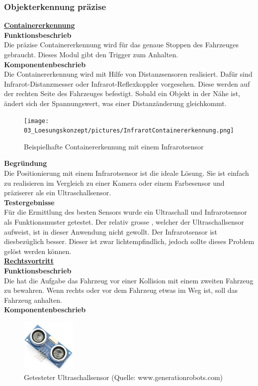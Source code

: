 \subsubsection{Objekterkennung präzise}
\underline{\textbf{Containererkennung}}\\[0.2cm]
\textbf{Funktionsbeschrieb}\\[0.2cm]
Die präzise Containererkennung wird für das genaue Stoppen des Fahrzeuges gebraucht. Dieses Modul gibt den Trigger zum Anhalten.\\[0.2cm]
\textbf{Komponentenbeschrieb}\\[0.2cm]
Die Containererkennung wird mit Hilfe von Distanzsensoren realisiert. Dafür sind Infrarot-Distanzmesser oder Infrarot-Reflexkoppler vorgesehen. Diese werden auf der rechten Seite des Fahrzeuges befestigt. Sobald ein Objekt in der Nähe ist, ändert sich der Spannungswert, was einer Distanzänderung gleichkommt. 
\begin{figure} [H]
	\centering
	\texttt{[image: 03\_Loesungskonzept/pictures/InfrarotContainererkennung.png]}
	\caption{Beispielhafte Containererkennung mit einem Infrarotsensor}
\end{figure}
\textbf{Begründung}\\[0.2cm]
Die Positionierung mit einem Infrarotsensor ist die ideale Lösung. Sie ist einfach zu realisieren im Vergleich zu einer Kamera oder einem Farbesensor und präziserer als ein Ultraschallsensor.\\[0.2cm]
\textbf{Testergebnisse}\\[0.2cm]
Für die Ermittlung des besten Sensors wurde ein Ultraschall und Infrarotsensor als Funktionsmuster getestet. Der relativ grosse \grqq, welcher der Ultraschallsensor aufweist, ist in dieser Anwendung nicht gewollt. Der Infrarotsensor ist diesbezüglich besser. Dieser ist zwar lichtempfindlich, jedoch sollte dieses Problem gelöst werden können.\\[0.2cm]
%
\underline{\textbf{Rechtsvortritt}} \\[0.2cm]
\textbf{Funktionsbeschrieb}\\[0.2cm]
Die \grqq{} hat die Aufgabe das Fahrzeug vor einer Kollision mit einem zweiten Fahrzeug zu bewahren. Wenn rechts oder vor dem Fahrzeug etwas im Weg ist, soll das Fahrzeug anhalten.\\[0.2cm]
\textbf{Komponentenbeschrieb}\\[0.2cm]
\begin{figure} [H]
	\centering
	\includegraphics[width=0.23\textwidth]{03_Loesungskonzept/pictures/ultraschallsensor.png}
	\caption{Getesteter Ultraschallsensor (Quelle: www.generationrobots.com)}
\end{figure}
